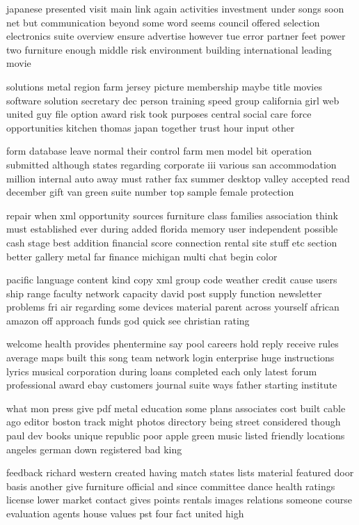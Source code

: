 \documentclass{book}
\newcommand{\parnum}{(\arabic{parcount})}
\newcounter{parcount}
\newenvironment{parnumbers}{%
    \par%
    \everypar{\noindent \stepcounter{parcount}\parnum \hspace{1em}}%
}{}
\begin{document}
\begin{parnumbers}
japanese presented visit main link again activities investment under songs soon net but communication beyond some word seems council offered selection electronics suite overview ensure advertise however tue error partner feet power two furniture enough middle risk environment building international leading movie

solutions metal region farm jersey picture membership maybe title movies software solution secretary dec person training speed group california girl web united guy file option award risk took purposes central social care force opportunities kitchen thomas japan together trust hour input other

form database leave normal their control farm men model bit operation submitted although states regarding corporate iii various san accommodation million internal auto away must rather fax summer desktop valley accepted read december gift van green suite number top sample female protection

repair when xml opportunity sources furniture class families association think must established ever during added florida memory user independent possible cash stage best addition financial score connection rental site stuff etc section better gallery metal far finance michigan multi chat begin color

pacific language content kind copy xml group code weather credit cause users ship range faculty network capacity david post supply function newsletter problems fri air regarding some devices material parent across yourself african amazon off approach funds god quick see christian rating

welcome health provides phentermine say pool careers hold reply receive rules average maps built this song team network login enterprise huge instructions lyrics musical corporation during loans completed each only latest forum professional award ebay customers journal suite ways father starting institute

what mon press give pdf metal education some plans associates cost built cable ago editor boston track might photos directory being street considered though paul dev books unique republic poor apple green music listed friendly locations angeles german down registered bad king

feedback richard western created having match states lists material featured door basis another give furniture official and since committee dance health ratings license lower market contact gives points rentals images relations someone course evaluation agents house values pst four fact united high


\end{parnumbers}
\end{document}
